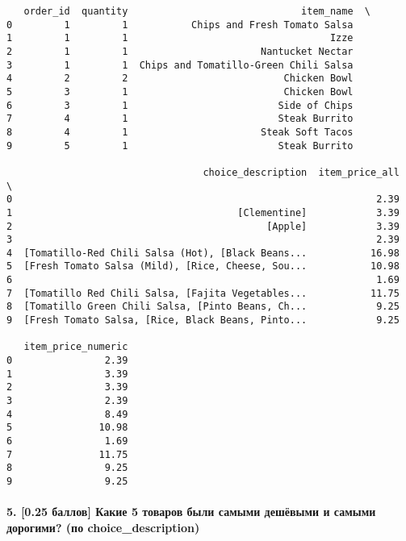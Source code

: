 \documentclass[11pt]{article}
\begin{document}
    
    \begin{verbatim}
   order_id  quantity                              item_name  \
0         1         1           Chips and Fresh Tomato Salsa   
1         1         1                                   Izze   
2         1         1                       Nantucket Nectar   
3         1         1  Chips and Tomatillo-Green Chili Salsa   
4         2         2                           Chicken Bowl   
5         3         1                           Chicken Bowl   
6         3         1                          Side of Chips   
7         4         1                          Steak Burrito   
8         4         1                       Steak Soft Tacos   
9         5         1                          Steak Burrito   

                                  choice_description  item_price_all  \
0                                                               2.39   
1                                       [Clementine]            3.39   
2                                            [Apple]            3.39   
3                                                               2.39   
4  [Tomatillo-Red Chili Salsa (Hot), [Black Beans...           16.98   
5  [Fresh Tomato Salsa (Mild), [Rice, Cheese, Sou...           10.98   
6                                                               1.69   
7  [Tomatillo Red Chili Salsa, [Fajita Vegetables...           11.75   
8  [Tomatillo Green Chili Salsa, [Pinto Beans, Ch...            9.25   
9  [Fresh Tomato Salsa, [Rice, Black Beans, Pinto...            9.25   

   item_price_numeric  
0                2.39  
1                3.39  
2                3.39  
3                2.39  
4                8.49  
5               10.98  
6                1.69  
7               11.75  
8                9.25  
9                9.25  
    \end{verbatim}

    
    \hypertarget{ux431ux430ux43bux43bux43eux432-ux43aux430ux43aux438ux435-5-ux442ux43eux432ux430ux440ux43eux432-ux431ux44bux43bux438-ux441ux430ux43cux44bux43cux438-ux434ux435ux448ux451ux432ux44bux43cux438-ux438-ux441ux430ux43cux44bux43cux438-ux434ux43eux440ux43eux433ux438ux43cux438-ux43fux43e-choice_description}{%
\paragraph{5. {[}0.25 баллов{]} Какие 5 товаров были самыми дешёвыми и
самыми дорогими? (по
choice\_description)}\label{ux431ux430ux43bux43bux43eux432-ux43aux430ux43aux438ux435-5-ux442ux43eux432ux430ux440ux43eux432-ux431ux44bux43bux438-ux441ux430ux43cux44bux43cux438-ux434ux435ux448ux451ux432ux44bux43cux438-ux438-ux441ux430ux43cux44bux43cux438-ux434ux43eux440ux43eux433ux438ux43cux438-ux43fux43e-choice_description}}
\end{document}
